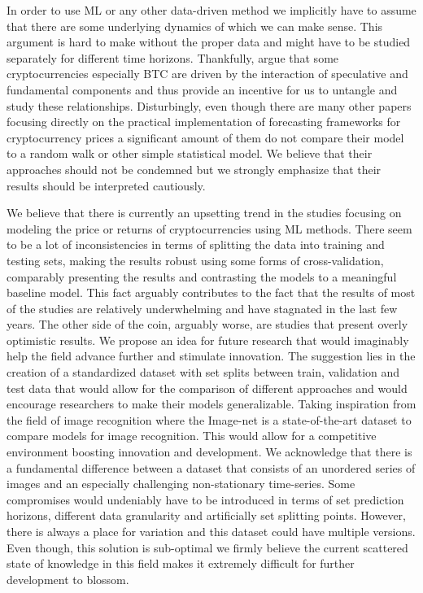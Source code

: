In order to use \ac{ML} or any other data-driven method we implicitly have to 
assume that there are some underlying dynamics of which we can make sense. 
This argument is hard to make without the proper data and might have to be 
studied separately for different time horizons. Thankfully, \cite{Kukacka2023}
argue that some cryptocurrencies especially \ac{BTC} are driven by the interaction of
speculative and fundamental components and thus provide an incentive for us 
to untangle and study these relationships. Disturbingly, even though 
there are many other papers focusing directly on the practical implementation of 
forecasting frameworks for cryptocurrency prices a significant amount of them
do not compare their model to a random walk or other simple statistical model.
We believe that their approaches should not be condemned but we 
strongly emphasize 
that their results should be interpreted cautiously.

We believe that there is currently an upsetting trend in the studies
focusing on modeling the price or returns of cryptocurrencies using \ac{ML} methods.
There seem to be a lot of inconsistencies in terms of splitting the data
into training and testing sets, making the results robust using some forms 
of cross-validation, comparably presenting the results and 
contrasting the models to a meaningful baseline model. 
This fact arguably contributes to the fact that the results of most of the studies 
are relatively underwhelming and have stagnated in the last few years.
The other side of the coin, arguably worse, are studies that 
present overly optimistic results.
We propose an idea for future research that would imaginably help the field
advance further and stimulate innovation. The suggestion lies in the creation
of a standardized dataset with set splits between train, validation and test data
that would allow for the comparison of different approaches and would
encourage researchers to make their models generalizable. Taking inspiration
from the field of image recognition where the Image-net is a state-of-the-art dataset
to compare models for image recognition. This would allow for a competitive 
environment boosting innovation and development.
We acknowledge that there is a fundamental difference between a dataset
that consists of an unordered series of images and an especially challenging
non-stationary time-series.
Some compromises would undeniably have to be introduced in terms of 
set prediction horizons, different data granularity and artificially set splitting points.
However, there is always a place for variation and this dataset 
could have multiple versions. Even though, this solution is sub-optimal 
we firmly believe the current scattered state of knowledge in this field 
makes it extremely difficult for further development to blossom.


